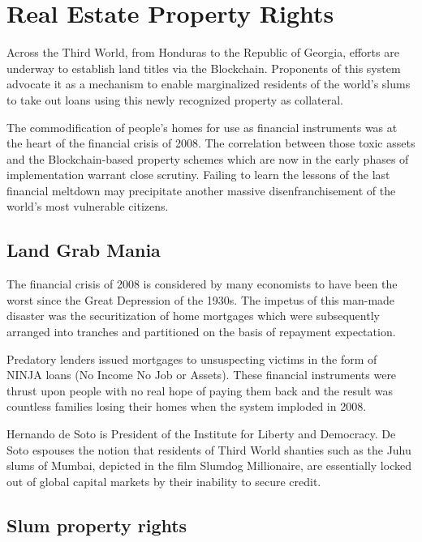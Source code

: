 
\section{Real Estate Property Rights}

Across the Third World, from Honduras to the Republic of Georgia, efforts are underway to establish land titles via the Blockchain. Proponents of this system advocate it as a mechanism to enable marginalized residents of the world's slums to take out loans using this newly recognized property as collateral.

The commodification of people's homes for use as financial instruments was at the heart of the financial crisis of 2008. The correlation between those toxic assets and the Blockchain-based property schemes which are now in the early phases of implementation warrant close scrutiny. Failing to learn the lessons of the last financial meltdown may precipitate another massive disenfranchisement of the world's most vulnerable citizens.

\subsection*{Land Grab Mania}

The financial crisis of 2008 is considered by many economists to have been the worst since the Great Depression of the 1930s. The impetus of this man-made disaster was the securitization of home mortgages which were subsequently arranged into tranches and partitioned on the basis of repayment expectation.

Predatory lenders issued mortgages to unsuspecting victims in the form of NINJA loans (No Income No Job or Assets). These financial instruments were thrust upon people with no real hope of paying them back and the result was countless families losing their homes when the system imploded in 2008.

Hernando de Soto is President of the Institute for Liberty and Democracy. De Soto espouses the notion that residents of Third World shanties such as the Juhu slums of Mumbai, depicted in the film Slumdog Millionaire, are essentially locked out of global capital markets by their inability to secure credit.

\subsection*{Slum property rights}

